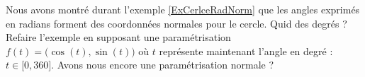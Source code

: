 \begin{exercice}\label{exoGeomAnal-0003}

Nous avons montré durant l'exemple \ref{ExCerlceRadNorm} que les angles exprimés en radians forment des coordonnées normales pour le cercle. Quid des degrés ? Refaire l'exemple en supposant une paramétrisation $f(t)=\big( \cos(t),\sin(t) \big)$ où $t$ représente maintenant l'angle en degré : $t\in\mathopen[ 0 , 360 \mathclose]$. Avons nous encore une paramétrisation normale ?

\end{exercice}
